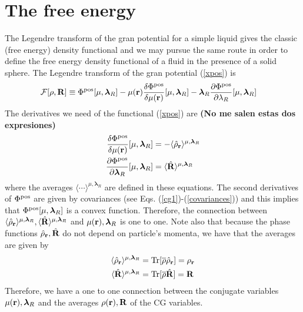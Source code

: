 \documentclass[a4paper,openright,12pt]{book}
\newcommand{\Note}[1]{{\bf \color{red}#1}}    %
\begin{document}
\section{The free energy}
The Legendre transform of the gran potential for a simple liquid gives the classic (free energy) density functional and we may pursue the same route in order to define the free energy density functional of a fluid in the presence of a solid sphere. The Legendre transform of the gran potential (\ref{xpos}) is
\begin{align}
  {\cal F}[\rho,{\bf R}]&\equiv  \Phi^{\rm pos}[\mu,\boldsymbol{\lambda}_R]
-\mu({\bf r})\frac{\delta\Phi^{\rm pos}}{\delta\mu({\bf r})}[\mu,\boldsymbol{\lambda}_R] 
-\boldsymbol{\lambda}_R\frac{\partial \Phi^{\rm pos}}{\partial \lambda_R}[\mu,\boldsymbol{\lambda}_R] 
\label{legPrev}
\end{align}
The derivatives we need of the functional (\ref{xpos}) are \Note{(No me salen estas dos expresiones)}
\begin{align}
 \frac{\delta \Phi^{\rm pos}}{\delta \mu({\bf r})}[\mu,\boldsymbol{\lambda}_R]&=-
\langle \hat{\rho}_{\bf r}\rangle^{\mu,\boldsymbol{\lambda}_R}
\nonumber\\
  \frac{\partial \Phi^{\rm pos}}{\partial \boldsymbol{\lambda}_R}[\mu,\boldsymbol{\lambda}_R]&=
\langle \hat{\bf R}\rangle^{\mu,\boldsymbol{\lambda}_R}
\end{align}
where               the                averages               $\langle
\cdots\rangle^{\mu,\boldsymbol{\lambda}_R}$   are  defined   in  these
equations.  The second  derivatives of $ \Phi^{\rm pos}$  are given by
covariances  (see   Eqs.  (\ref{cg1})-(\ref{covariances}))   and  this
implies that $\Phi^{\rm  pos}[\mu,\boldsymbol{\lambda}_R]$ is a convex
function.  Therefore, the  connection between $\langle \hat{\rho}_{\bf
  r}\rangle^{\mu,\boldsymbol{\lambda}_R},       \langle       \hat{\bf
  R}\rangle^{\mu,\boldsymbol{\lambda}_R}$         and        $\mu({\bf
  r}),\boldsymbol{\lambda}_R$ is  one to  one. Note also  that because
the phase functions  $ \hat{\rho}_{\bf r}, \hat{\bf R}$  do not depend
on particle's momenta, we have that the averages are given by
\begin{align}
  \langle \hat{\rho}_{\bf r}\rangle^{\mu,\boldsymbol{\lambda}_R} &={\rm Tr}[\overline{\rho}\hat{\rho}_{\bf r}]=\rho_{\bf r}
\nonumber\\
  \langle \hat{\bf R}\rangle^{\mu,\boldsymbol{\lambda}_R} &={\rm Tr}[\overline{\rho}\hat{\bf R}]={\bf R}
\end{align}
Therefore,  we have  a one  to  one connection  between the  conjugate
variables  $\mu({\bf  r}),\boldsymbol{\lambda}_R$   and  the  averages
$\rho({\bf  r}),{\bf  R}$  of  the  CG  variables.
\end{document}
